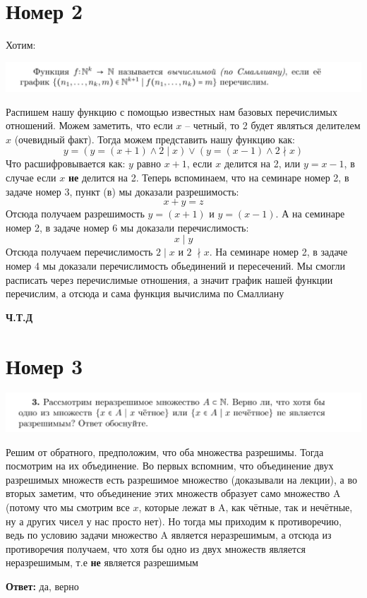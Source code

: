 \documentclass[a4paper,12pt]{article}
\begin{document}
\section*{Номер 2}
Хотим:
\begin{center}
\includegraphics[scale=0.5]{1.png}
\end{center}
Распишем нашу функцию с помощью известных нам базовых перечислимых отношений. Можем заметить, что если $x$ -- четный, то 2 будет являться делителем $x$ (очевидный факт). Тогда можем представить нашу функцию как:
\[
y = (y = (x + 1) \wedge 2 \; | \; x) \vee (y = (x - 1) \wedge 2 \nmid x)
\]
Что расшифровывается как: $y$ равно $x + 1$, если $x$ делится на 2, или $y = x -1$, в случае если $x$ \textbf{не} делится на 2. 
Теперь вспоминаем, 
что на семинаре номер 2, в задаче номер 3, пункт (в) мы доказали разрешимость:
\[
x + y = z
\]
Отсюда получаем разрешимость $y = (x + 1)$ и $y = (x - 1)$. А на семинаре номер 2, в задаче номер 6 мы доказали перечислимость:
\[
x \; | \; y 
\]
Отсюда получаем перечислимость $ 2 \; | \; x$ и $2 \; \nmid x $. На семинаре номер 2, в задаче номер 4 мы доказали перечислимость обьединений и пересечений. Мы смогли расписать через перечислимые отношения, а значит график нашей функции перечислим, а отсюда и сама функция вычислима по Смаллиану
\begin{center}
\textbf{Ч.Т.Д} 
\end{center}
\clearpage
\section*{Номер 3}
\begin{center}
\includegraphics[scale=0.4]{3.png}
\end{center}
Решим от обратного, предположим, что оба множества разрешимы. Тогда посмотрим на их объединение. Во первых вспомним, что объединение двух разрешимых множеств есть разрешимое множество (доказывали на лекции), а во вторых заметим, что объединение этих множеств образует само множество A (потому что мы смотрим все $x$, которые лежат в A, как чётные, так и нечётные, ну а других чисел у нас просто нет). Но тогда мы приходим к противоречию, ведь по условию задачи множество A является неразрешимым, а отсюда из противоречия получаем, что хотя бы одно из двух множеств является неразрешимым, т.е \textbf{не} является разрешимым
\begin{center}
\textbf{Ответ: } да, верно
\end{center}
\end{document}
